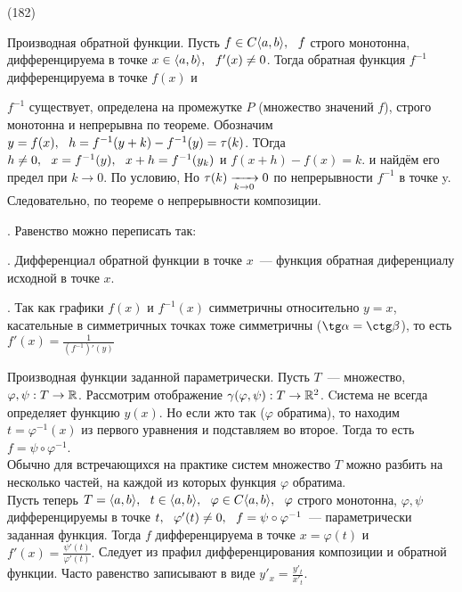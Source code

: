 (182)

\T \q Производная обратной функции. Пусть $f \in C\langle a, b \rangle,\ \  f$ строго монотонна, дифференцируема в точке $x \in \langle a, b \rangle,\ \  f'(x) \neq 0$. Тогда обратная функция $f^{-1}$ дифференцируема в точке $f(x)$ и 

\D $f^{-1}$ существует, определена на промежутке $P$ (множество значений $f$), строго монотонна и непрерывна по теореме. Обозначим $y = f(x),\ \  h = f^{-1} (y + k) - f^{-1}(y) = \tau(k)$. ТОгда $h \neq 0,\ \  x = f^{-1}(y),\ \  x +h = f^{-1}(y _ k)$ и $f(x + h) - f(x) = k$.
 и найдём его предел при $k \to 0$. По условию,  Но $\tau(k) \xrightarrow[k \to 0]{} 0$ по непрерывности $f^{-1}$ в точке y. Следовательно,  по теореме о непрерывности композиции.

. Равенство можно переписать так: 

. Дифференциал обратной функции в точке $x$~---  функция обратная диференциалу исходной в точке $x$.

. Так как графики $f(x)$ и $f^{-1}(x)$ симметричны относительно $y = x$, касательные в симметричных точках тоже симметричны ($\tg \alpha = \ctg \beta$), то есть $f'(x) = \frac 1{(f^{-1})'(y)}$

\q Производная функции заданной параметрически.
Пусть $T$~--- множество, $\varphi, \psi: T \to \mathbb{R}$. Рассмотрим отображение $\gamma(\varphi, \psi): T \to \mathbb{R}^2$. Cистема  не всегда определяет функцию $y(x)$. Но если жто так ($\varphi$ обратима), то находим $t = \varphi^{-1}(x)$ из первого уравнения и подставляем во второе. Тогда  то есть $f = \psi \circ \varphi^{-1}$.\\
Обычно для встречающихся на практике систем множество $T$ можно разбить на несколько частей, на каждой из которых функция $\varphi$ обратима.\\
Пусть теперь $T = \langle a, b \rangle,\ \  t \in \langle a, b \rangle,\ \  \varphi \in C\langle a, b \rangle,\ \  \varphi$ строго монотонна, $\varphi, \psi$ дифференцируемы в точке $t,\ \  \varphi'(t) \neq 0,\ \  f = \psi\circ\varphi^{-1}$~--- параметрически заданная функция. Тогда $f$ дифференцируема в точке $x = \varphi(t)$ и $f'(x) = \frac{\psi'(t)}{\varphi'(t)}.$ Следует из прафил дифференцирования композиции и обратной функции. Часто равенство записывают в виде $y'_x = \frac{y'_t}{x'_t}$.